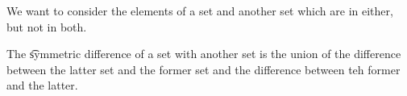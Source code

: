 
\sbasic










\sstart
{}


We want to consider the elements of a set and another set which are in either, but not in both.


The \t{symmetric difference} of a set with another set is the union of the difference between the latter set and the former set and the difference between teh former and the latter.
\strats

